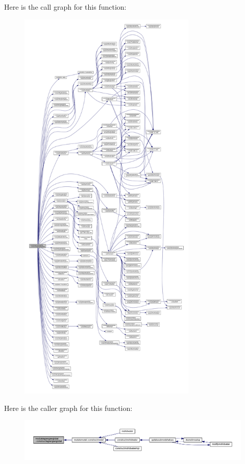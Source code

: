 Here is the call graph for this function\+:\nopagebreak
\begin{figure}[H]
\begin{center}
\leavevmode
\includegraphics[height=550pt]{namespacemodulelagrangianglobal_a19213baf32d688585211b786d897cd69_cgraph}
\end{center}
\end{figure}
Here is the caller graph for this function\+:\nopagebreak
\begin{figure}[H]
\begin{center}
\leavevmode
\includegraphics[width=350pt]{namespacemodulelagrangianglobal_a19213baf32d688585211b786d897cd69_icgraph}
\end{center}
\end{figure}
\mbox{\label{namespacemodulelagrangianglobal_aa700601bd9f8ad04a50534e66725efc4}} 
